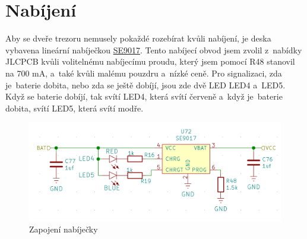 \section{Nabíjení}

Aby se dveře trezoru nemusely pokaždé rozebírat kvůli nabíjení, je deska vybavena lineární nabíječkou 
\href{https://datasheet.lcsc.com/szlcsc/Seaward-Elec-SE9017-HF_C115752.pdf}{SE9017}. 
Tento nabíjecí obvod jsem zvolil z~nabídky JLCPCB kvůli volitelnému nabíjecímu proudu, který jsem pomocí R48 stanovil na 700 mA, a~také kvůli malému 
pouzdru a~nízké ceně.
Pro signalizaci, zda je~baterie dobita, nebo zda se ještě dobíjí, jsou zde dvě LED LED4 a~LED5. Když se baterie dobíjí, tak svítí LED4, která svítí 
červeně a~když je~baterie dobita, svítí LED5, která svítí modře.

\begin{figure}[htbp]
    \centering
    \includegraphics[width=\textwidth]{kapitoly/obrazky/E4/nabijeni/nabijecka.png}
    \caption{Zapojení nabíječky}
    \label{fig:E4-step-up}
\end{figure}

\newpage
